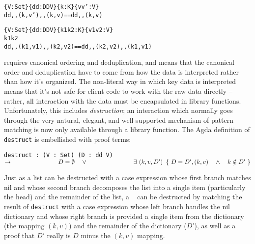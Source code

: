 

\begin{theorem}
\label{thm:cont-dicts}
\justIndent
\begin{alltt}
\{V : Set\} \{dd : DD V\} \{k : K\} \{v v' : V\} \altRArr
  dd ,, (k , v') ,, (k , v) == dd ,, (k , v)
\end{alltt}
\end{theorem}

\begin{theorem}
\label{thm:exch-dicts}
\justIndent
\begin{alltt}
\{V : Set\} \{dd : DD V\} \{k1 k2 : K\} \{v1 v2 : V\} \altRArr
  k1 \altNE k2 \altRArr
  dd ,, (k1 , v1) ,, (k2 , v2) == dd ,, (k2 , v2) ,, (k1 , v1)
\end{alltt}
\end{theorem}


\SemInj{} requires canonical ordering and deduplication, and \SemTot{} means that the canonical order and deduplication have to come from
how the data is interpreted rather than how it's organized. The non-literal way in which key data is interpreted means that it's not
safe for client code to work with the raw data directly -- rather, all interaction with the data must be
encapsulated in library functions. Unfortunately, this includes \emph{destruction}; an interaction which
normally goes through the very natural, elegant, and well-supported mechanism of pattern matching is now
only available through a library function. The Agda definition of \verb+destruct+ is embellished with proof terms:

\texttt{destruct : (V : Set) (D : dd V) $\rightarrow \\
\phantom{xxxxxxxxxxxxx} D = \emptyset \quad \lor \\
\phantom{xxxxxxxxxxxxx} \exists~(k, v, D')~\left\{~ D = D' , (k, v) \quad \land \quad k \notin D' ~\right\}$}

Just as a list can be destructed with a case expression whose first branch matches nil and whose second branch
decomposes the list into a single item (particularly the head) and the remainder of the list, a \dd~ can be
destructed by matching the result of \verb+destruct+ with a case expression whose left branch handles the
nil dictionary and whose right branch is provided a single item from the dictionary (the mapping $(k, v)$)
and the remainder of the dictionary ($D'$), as well as a proof that $D'$ really is $D$ minus the $(k, v)$
mapping.

